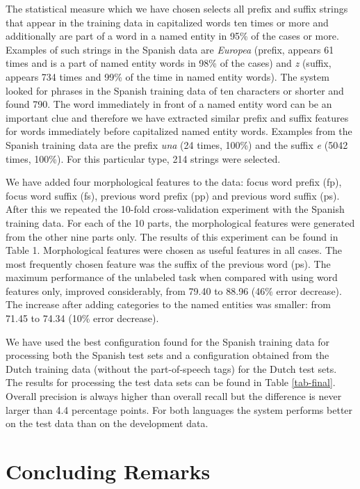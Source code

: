 \documentclass[10pt]{article}
\begin{document}
The statistical measure which we have chosen selects all prefix and
suffix strings that appear in the training data in capitalized words
ten times or more and additionally are part of a word in a named
entity in 95\% of the cases or more. 
Examples of such strings in the Spanish data are {\it Europea}
(prefix, appears 61 times and is a part of named entity words in 98\%
of the cases) and {\it z} (suffix, appears 734 times and 99\% of the
time in named entity words).
The system looked for phrases in the Spanish training data of ten
characters or shorter and found 790.
The word immediately in front of a named entity word can be an important
clue and therefore we have extracted similar prefix and suffix
features for words immediately before capitalized named entity words.
Examples from the Spanish training data are the prefix {\it una}
(24 times, 100\%) and the suffix {\it e} (5042 times, 100\%).
For this particular type, 214 strings were selected.

We have added four morphological features to the data: focus word
prefix (fp), focus word suffix (fs), previous word prefix (pp) and
previous word suffix (ps).
After this we repeated the 10-fold cross-validation experiment with
the Spanish training data.
For each of the 10 parts, the morphological features were generated
from the other nine parts only.
The results of this experiment can be found in Table 1.
Morphological features were chosen as useful features in all cases.
The most frequently chosen feature was the suffix of the previous
word (ps).
The maximum performance of the unlabeled task when compared with using
word features only, improved considerably, from 79.40 to 88.96 (46\%
error decrease). 
The increase after adding categories to the named entities was
smaller: from 71.45 to 74.34 (10\% error decrease).

We have used the best configuration found for the Spanish training
data for processing both the Spanish test sets and a configuration
obtained from the Dutch training data (without the part-of-speech
tags) for the Dutch test sets.
The results for processing the test data sets can be found in Table
\ref{tab-final}.
Overall precision is always higher than overall recall but the
difference is never larger than 4.4 percentage points.
For both languages the system performs better on the test data than
on the development data.

\section{Concluding Remarks}
\end{document}
